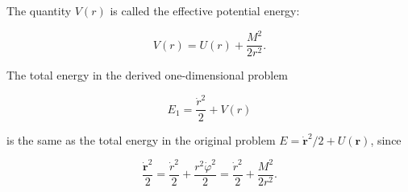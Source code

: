 The quantity $V(r)$ is called the effective potential energy:

$$V(r) = U(r) + \frac{M^2}{2r^2}.$$

The total energy in the derived one-dimensional problem

$$E_1 = \frac{\dot{r}^2}{2} + V(r)$$

is the same as the total energy in the original problem $E = \dot{\mathbf{r}}^2/2 + U(\mathbf{r})$, since

$$\frac{\dot{\mathbf{r}}^2}{2} = \frac{\dot{r}^2}{2} + \frac{r^2 \dot{\varphi}^2}{2} = \frac{\dot{r}^2}{2} + \frac{M^2}{2r^2}.$$
